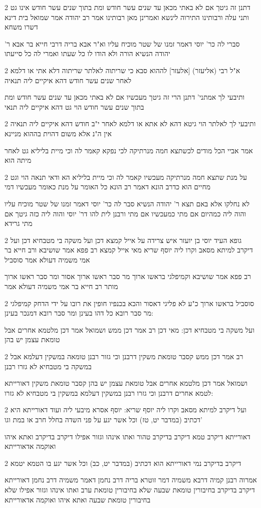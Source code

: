 \documentclass[12pt, openany]{book}
\newcommand{\sethebfont}{
\fontsize{10.5pt}{21.0pt} \selectfont
}
\newcommand{\twocol}[1]{
	{\sethebfont \begin{multicols}{2}
			#1
	\end{multicols}}	
}
\begin{document}
\twocol{דתנן זה גיטך אם לא באתי מכאן עד שנים עשר חודש ומת בתוך שנים עשר חודש אינו גט ותני עלה ורבותינו התירוה לינשא ואמרינן מאן רבותינו אמר רב יהודה אמר שמואל בית דינא דשרו משחא
\par סברי לה כר' יוסי דאמר זמנו של שטר מוכיח עליו וא"ר אבא בריה דרבי חייא בר אבא ר' יהודה הנשיא הורה ולא הודו לו כל שעתו ואמרי לה כל סייעתו}
\twocol{א"ל רבי (אליעזר) [אלעזר] לההוא סבא כי שריתוה לאלתר שריתוה דלא אתי או דלמא לאחר שנים עשר חודש דהא איקיים ליה תנאיה
\par ותיבעי לך אמתני' דתנן הרי זה גיטך מעכשיו אם לא באתי מכאן עד שנים עשר חודש ומת בתוך שנים עשר חודש הוי גט דהא איקיים ליה תנאי}
\twocol{ותיבעי לך לאלתר הוי גיטא דהא לא אתא או דלמא לאחר י"ב חודש דהא איקיים ליה תנאיה אין ה"נ אלא משום דהוית בההוא מניינא
\par אמר אביי הכל מודים לכשתצא חמה מנרתיקה לכי נפקא קאמר לה וכי מיית בליליא גט לאחר מיתה הוא}
\twocol{על מנת שתצא חמה מנרתיקה מעכשיו קאמר לה וכי מיית בליליא הא ודאי תנאה הוי וגט מחיים הוא כדרב הונא דאמר רב הונא כל האומר על מנת כאומר מעכשיו דמי
\par לא נחלקו אלא באם תצא ר' יהודה הנשיא סבר לה כר' יוסי דאמר זמנו של שטר מוכיח עליו והוה ליה כמהיום אם מתי כמעכשיו אם מתי ורבנן לית להו דר' יוסי והוה ליה כזה גיטך אם מתי גרידא}
\twocol{גופא העיד יוסי בן יועזר איש צרידה על אייל קמצא דכן ועל משקה בי מטבחיא דכן ועל דיקרב למיתא מסאב וקרו ליה יוסף שריא מאי אייל קמצא רב פפא אמר שושיבא ורב חייא בר אמי משמיה דעולא אמר סוסביל
\par רב פפא אמר שושיבא וקמיפלגי בראשו ארוך מר סבר ראשו ארוך אסור ומר סבר ראשו ארוך מותר רב חייא בר אמי משמיה דעולא אמר}
\twocol{סוסביל בראשו ארוך כ"ע לא פליגי דאסור והכא בכנפיו חופין את רובו על ידי הדחק קמיפלגי מר סבר רובא כל דהו בעינן ומר סבר רובא דמנכר בעינן:
\par ועל משקה בי מטבחיא דכן: מאי דכן רב אמר דכן ממש ושמואל אמר דכן מלטמא אחרים אבל טומאת עצמן יש בהן}
\twocol{רב אמר דכן ממש קסבר טומאת משקין דרבנן וכי גזור רבנן טומאה במשקין דעלמא אבל במשקה בי מטבחיא לא גזרו רבנן
\par ושמואל אמר דכן מלטמא אחרים אבל טומאת עצמן יש בהן קסבר טומאת משקין דאורייתא לטמא אחרים דרבנן וכי גזרו רבנן במשקין דעלמא במשקין בי מטבחיא לא גזרו:}
\twocol{ועל דיקרב למיתא מסאב וקרו ליה יוסף שריא: יוסף אסרא מיבעי ליה ועוד דאורייתא היא דכתיב (במדבר יט, טז) וכל אשר יגע על פני השדה בחלל חרב או במת וגו'
\par דאורייתא דיקרב טמא דיקרב בדיקרב טהור ואתו אינהו וגזור אפילו דיקרב בדיקרב ואתא איהו ואוקמה אדאורייתא}
\twocol{דיקרב בדיקרב נמי דאורייתא הוא דכתיב (במדבר יט, כב) וכל אשר יגע בו הטמא יטמא
\par אמרוה רבנן קמיה דרבא משמיה דמר זוטרא בריה דרב נחמן דאמר משמיה דרב נחמן דאורייתא דיקרב בדיקרב בחיבורין טומאת שבעה שלא בחיבורין טומאת ערב ואתו אינהו וגזור אפילו שלא בחיבורין טומאת שבעה ואתא איהו ואוקמה אדאורייתא}
\end{document}
